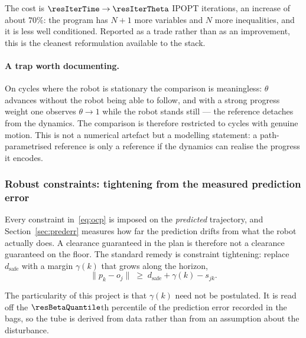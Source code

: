\documentclass[11pt,a4paper]{article}
\newcommand{\dsafe}{d_{\mathrm{safe}}}
\begin{document}
The cost is $\resIterTime\to\resIterTheta$ IPOPT iterations, an increase of about $70\%$: the program has
$N+1$ more variables and $N$ more inequalities, and it is less well conditioned. Reported as a trade rather
than as an improvement, this is the cleanest reformulation available to the stack.

\paragraph{A trap worth documenting.} On cycles where the robot is stationary the comparison is meaningless:
$\theta$ advances without the robot being able to follow, and with a strong progress weight one observes
$\theta\to1$ while the robot stands still --- the reference detaches from the dynamics. The comparison is
therefore restricted to cycles with genuine motion. This is not a numerical artefact but a modelling
statement: a path-parametrised reference is only a reference if the dynamics can realise the progress it
encodes.

\subsubsection{Robust constraints: tightening from the measured prediction error}
\label{sec:robust}

Every constraint in~\eqref{eq:ocp} is imposed on the \emph{predicted} trajectory, and
Section~\ref{sec:prederr} measures how far the prediction drifts from what the robot actually does. A
clearance guaranteed in the plan is therefore not a clearance guaranteed on the floor. The standard remedy is
constraint tightening: replace $\dsafe$ with a margin $\gamma(k)$ that grows along the horizon,
\begin{equation}
  \big\|p_k-o_j\big\| \;\ge\; \dsafe+\gamma(k)-s_{jk}.
  \label{eq:tighten}
\end{equation}

The particularity of this project is that $\gamma(k)$ need not be postulated. It is read off the
$\resBetaQuantile$th percentile of the prediction error recorded in the bags, so the tube is derived from
data rather than from an assumption about the disturbance.

\begin{table}[htbp]
  \centering
  \small
  \caption{Constraint back-off derived from the $95$th percentile of the measured prediction error. The offset at $k=0$ is subtracted: it is time misalignment, not model uncertainty, and including it would inflate the tube by a constant.}
  \label{res:tab:beta}
\end{table}
\end{document}
